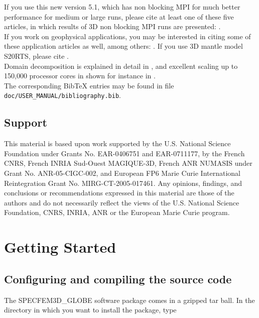 \documentclass[oneside,english]{book}
\begin{document}
If you use this new version 5.1, which has non blocking MPI for much better performance for medium or large runs, please cite at least one of these five articles,
in which results of 3D non blocking MPI runs are presented: \cite{KoErGoMi10,KoViCh10,Kom11,PeKoLuMaLeCaLeMaLiBlNiBaTr11,CaKoLaTiMiLeSnTr08}.\\

If you work on geophysical applications, you may be interested in citing some of these application articles as well, among others:
\cite{WiKoScTr04,JiTsKoTr05,KrJiKoTr06a,KrJiKoTr06b,LeChLiKoHuTr08,LeChKoHuTr09,LeKoHuTr09,ChFaKo04,FaChKo04,RiRiKoTrHe02,GoAmTaCaSmSaMaKo09,TrKo00,SaKoTr10}.
If you use 3D mantle model S20RTS, please cite \citet{RiVaWo99}.\\

Domain decomposition is explained in detail in \cite{MaKoBlLe08}, and excellent scaling up to 150,000 processor cores in shown for instance in
\cite{CaKoLaTiMiLeSnTr08,KoLaMi08a,MaKoBlLe08,KoErGoMi10,Kom11}.\\

The corresponding Bib\TeX{} entries may be found
in file \texttt{doc/USER\_MANUAL/bibliography.bib}.

\section{Support}

This material is based upon work supported by the U.S. National Science
Foundation under Grants No. EAR-0406751 and EAR-0711177, by the French
CNRS, French INRIA Sud-Ouest MAGIQUE-3D, French ANR NUMASIS under
Grant No. ANR-05-CIGC-002, and European FP6 Marie Curie International
Reintegration Grant No. MIRG-CT-2005-017461.
Any opinions, findings, and conclusions or recommendations expressed in this material are
those of the authors and do not necessarily reflect the views of the
U.S. National Science Foundation, CNRS, INRIA, ANR or the European
Marie Curie program.


\chapter{\label{cha:Getting-Started}Getting Started}

\section{Configuring and compiling the source code}

The SPECFEM3D\_GLOBE software package comes in a gzipped tar ball.
In the directory in which you want to install the package, type
\end{document}
